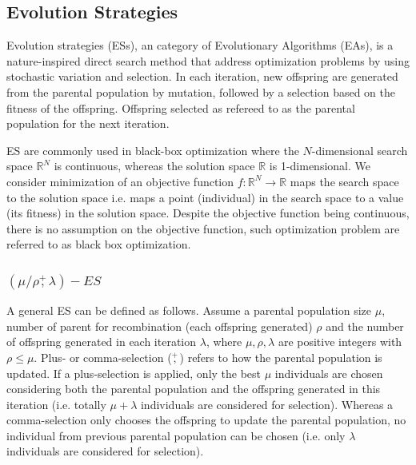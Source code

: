 \subsection{Evolution Strategies}

Evolution strategies (ESs), an category of Evolutionary Algorithms (EAs), is a nature-inspired direct search method that address optimization problems by using stochastic variation and selection. In each iteration, new offspring are generated from the parental population by mutation, followed by a selection based on the fitness of the offspring. Offspring selected as refereed to as the parental population for the next iteration. 

ES are commonly used in black-box optimization where the $N$-dimensional search space $\mathbb{R}^N$ is continuous, whereas the solution space $\mathbb{R}$ is 1-dimensional. We consider minimization of an objective function $f:\mathbb{R}^N \rightarrow \mathbb{R}$ maps the search space to the solution space i.e. maps a point (individual) in the search space to a value (its fitness) in the solution space. Despite the objective function being continuous, there is no assumption on the objective function, such optimization problem are referred to as black box optimization. 

\subsubsection{$(\mu/\rho\overset{+}{,}\lambda)-ES$}\hfill
 
A general ES can be defined as follows. Assume a parental population size $\mu$, number of parent for recombination (each offspring generated) $\rho$ and the number of offspring generated in each iteration $\lambda$, where $\mu,\rho,\lambda$ are positive integers with $\rho \leq \mu$. Plus- or comma-selection ($\overset{+}{,}$) refers to how the parental population is updated. If a plus-selection is applied, only the best $\mu$ individuals are chosen considering both the parental population and the offspring generated in this iteration (i.e. totally $\mu+\lambda$ individuals are considered for selection). Whereas a comma-selection only chooses the offspring to update the parental population, no individual from previous parental population can be chosen (i.e. only $\lambda$ individuals are considered for selection).    

